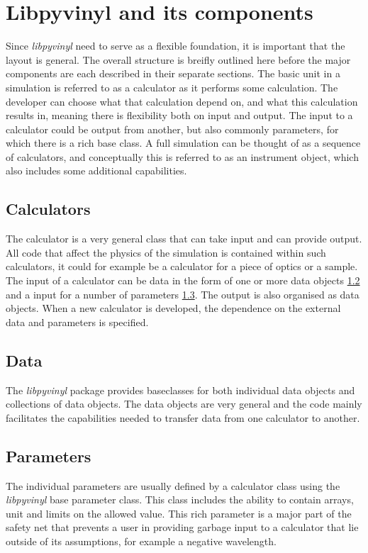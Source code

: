 \documentclass[10pt]{scrartcl}
\begin{document}
\section{Libpyvinyl and its components}
\label{sec:libpyvinyl}
Since \textit{libpyvinyl} need to serve as a flexible foundation, it is important that the layout is general. The overall structure is breifly outlined here before the major components are each described in their separate sections. The basic unit in a simulation is referred to as a calculator as it performs some calculation. The developer can choose what that calculation depend on, and what this calculation results in, meaning there is flexibility both on input and output. The input to a calculator could be output from another, but also commonly parameters, for which there is a rich base class. A full simulation can be thought of as a sequence of calculators, and conceptually this is referred to as an instrument object, which also includes some additional capabilities.

\subsection{Calculators}
\label{sec:calculators}
The calculator is a very general class that can take input and can provide output. All code that affect the physics of the simulation is contained within such calculators, it could for example be a calculator for a piece of optics or a sample. The input of a calculator can be data in the form of one or more data objects \ref{sec:data} and a input for a number of parameters \ref{sec:parameters}. The output is also organised as data objects. When a new calculator is developed, the dependence on the external data and parameters is specified.

\subsection{Data}
\label{sec:data}
The \textit{libpyvinyl} package provides baseclasses for both individual data objects and collections of data objects. The data objects are very general and the code mainly facilitates the capabilities needed to transfer data from one calculator to another.

\subsection{Parameters}
\label{sec:parameters}
The individual parameters are usually defined by a calculator class using the \textit{libpyvinyl} base parameter class. This class includes the ability to contain arrays, unit and limits on the allowed value. This rich parameter is a major part of the safety net that prevents a user in providing garbage input to a calculator that lie outside of its assumptions, for example a negative wavelength. 
\end{document}
